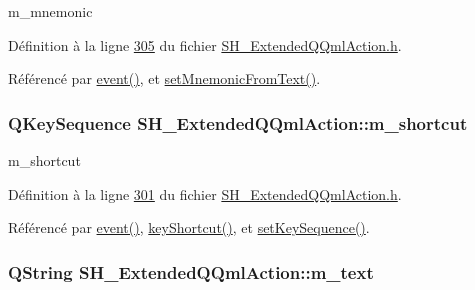 m\-\_\-mnemonic 



Définition à la ligne \hyperlink{SH__ExtendedQQmlAction_8h_source_l00305}{305} du fichier \hyperlink{SH__ExtendedQQmlAction_8h_source}{S\-H\-\_\-\-Extended\-Q\-Qml\-Action.\-h}.



Référencé par \hyperlink{classSH__ExtendedQQmlAction_a218053d85e9fc54e06ab39b1bb37dd4b}{event()}, et \hyperlink{classSH__ExtendedQQmlAction_a717e828cb0341e3d77eabe05e6143032}{set\-Mnemonic\-From\-Text()}.

\hypertarget{classSH__ExtendedQQmlAction_ac84d3a2113efb715321b905580b08bc5}{
\subsubsection[{m\-\_\-shortcut}]{\setlength{\rightskip}{0pt plus 5cm}Q\-Key\-Sequence S\-H\-\_\-\-Extended\-Q\-Qml\-Action\-::m\-\_\-shortcut\hspace{0.3cm}{\ttfamily [private]}}}\label{classSH__ExtendedQQmlAction_ac84d3a2113efb715321b905580b08bc5}


m\-\_\-shortcut 



Définition à la ligne \hyperlink{SH__ExtendedQQmlAction_8h_source_l00301}{301} du fichier \hyperlink{SH__ExtendedQQmlAction_8h_source}{S\-H\-\_\-\-Extended\-Q\-Qml\-Action.\-h}.



Référencé par \hyperlink{classSH__ExtendedQQmlAction_a218053d85e9fc54e06ab39b1bb37dd4b}{event()}, \hyperlink{classSH__ExtendedQQmlAction_a2efb60c1b33a04e8e58ef9184dccbd2d}{key\-Shortcut()}, et \hyperlink{classSH__ExtendedQQmlAction_a7d624821268cc19aa44bcda3cd85b967}{set\-Key\-Sequence()}.

\hypertarget{classSH__ExtendedQQmlAction_a8fd83c5e68691a582fa7e0c62d661c71}{
\subsubsection[{m\-\_\-text}]{\setlength{\rightskip}{0pt plus 5cm}Q\-String S\-H\-\_\-\-Extended\-Q\-Qml\-Action\-::m\-\_\-text\hspace{0.3cm}{\ttfamily [private]}}}\label{classSH__ExtendedQQmlAction_a8fd83c5e68691a582fa7e0c62d661c71}


